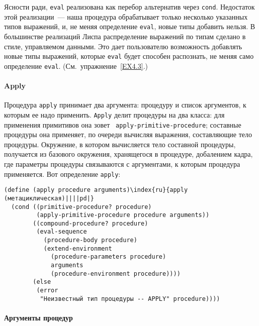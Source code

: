 Ясности ради, {\tt eval} реализована как
перебор альтернатив через {\tt cond}.  Недостаток этой 
реализации~--- наша
процедура обрабатывает только несколько указанных типов выражений, и,
не меняя определение {\tt eval}, новые типы добавить нельзя.  В
большинстве реализаций Лиспа распределение выражений по типам сделано
в стиле, управляемом данными.  Это дает пользователю возможность добавлять
новые типы выражений, которые {\tt eval} будет способен
распознать, не меняя само определение {\tt eval}. 
(См.~упражнение~\ref{EX4.3}.)

\paragraph{Apply}


Процедура {\tt apply} принимает два аргумента:
процедуру и список аргументов, к которым ее надо
применить. {\tt Apply} делит процедуры на два класса: для
применения примитивов она зовет {\tt 
apply-primitive-procedure};
составные процедуры она
применяет, по очереди вычисляя выражения, составляющие тело
процедуры.  Окружение, в котором вычисляется тело составной процедуры,
получается из базового окружения, хранящегося в
процедуре, добалением кадра, где параметры процедуры связываются с
аргументами, к которым процедура применяется.  Вот определение
{\tt apply}:

\begin{Verbatim}[fontsize=\small]
(define (apply procedure arguments)\index{ru}{apply (метациклическая)||||pd|}
  (cond ((primitive-procedure? procedure)
         (apply-primitive-procedure procedure arguments))
        ((compound-procedure? procedure)
         (eval-sequence
           (procedure-body procedure)
           (extend-environment
             (procedure-parameters procedure)
             arguments
             (procedure-environment procedure))))
        (else
         (error
          "Неизвестный тип процедуры -- APPLY" procedure))))
\end{Verbatim}

\paragraph{Аргументы процедур}

